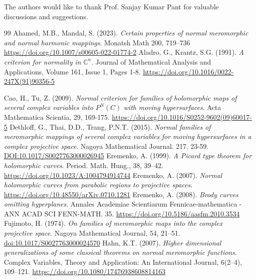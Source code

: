 \documentclass[11pt, reqno]{amsart}
\theoremstyle{definition}
\theoremstyle{remark}
\numberwithin{equation}{section}
\begin{document}
The authors would like to thank Prof. Sanjay Kumar Pant for valuable discussions and suggestions.

\begin{thebibliography}{99}
 \label{ahamed-cponmanhm-2023} Ahamed, M.B., Mandal, S. (2023). \textit{Certain properties of normal meromorphic and normal harmonic mappings}. Monatsh Math 200, 719–736 \url{https://doi.org/10.1007/s00605-022-01774-2}
 \label{ala-acfnicn-1991} Aladro, G., Krantz, S.G. (1991). 
\textit{A criterion for normality in $\mathbb C^n$}.
Journal of Mathematical Analysis and Applications,
Volume 161, Issue 1, Pages 1-8.
\url{https://doi.org/10.1016/0022-247X(91)90356-5}

 \label{cao-ncffohmoscvipncwmh-2009} Cao, H., Tu, Z. (2009). \textit{Normal criterion for families of holomorphic maps of several complex variables into $P^N(C)$ with moving hypersurfaces}. Acta Mathematica Scientia, 29, 169-175. \url{https://doi.org/10.1016/S0252-9602(09)60017-5}
 \label{deth-nfommoscvfmhiacps-2015} Dethloff, G., Thai, D.D., Trang, P.N.T. (2015). \textit{Normal families of meromorphic mappings of several complex variables for moving hypersurfaces in a complex projective space}. Nagoya Mathematical Journal. 217. 23-59. \url{DOI:10.1017/S0027763000026945}
 \label{ere-apttfhc-1999} Eremenko, A. (1999). \textit{A Picard type theorem for holomorphic curves}. Period. Math. Hung., 38, 39–42.
\url{https://doi.org/10.1023/A:1004794914744}
 \label{ere-nhcfprtps-2007} Eremenko, A. (2007). \textit{Normal holomorphic curves from parabolic regions to projective spaces}. \url{https://doi.org/10.48550/arXiv.0710.1281}
 \label{ere-bcoh-2008} Eremenko, A. (2008). \textit{Brody curves omitting hyperplanes}. Annales Academiae Scientiarum Fennicae-mathematica - ANN ACAD SCI FENN-MATH. 35.
\url{https://doi.org/10.5186/aasfm.2010.3534}
 \label{fuji-ofommitcps-1974} Fujimoto, H. (1974). \textit{On families of meromorphic maps into the complex projective space}. Nagoya Mathematical Journal, 54, 21–51. \url{doi:10.1017/S0027763000024570}
 \label{hahn-hdgosctonmf-2007} Hahn, K.T. (2007). \textit{Higher dimensional generalizations of some classical theorems on normal meromorphic functions}. Complex Variables, Theory and Application: An International Journal, 6(2–4), 109–121. \url{https://doi.org/10.1080/17476938608814163}

\end{thebibliography}
\end{document}
